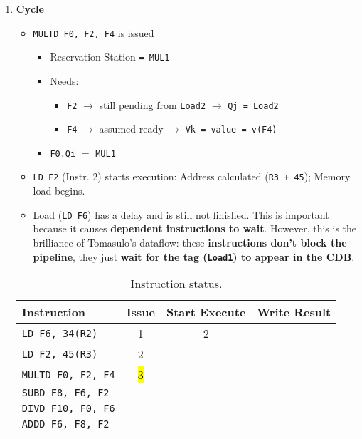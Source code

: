 \begin{enumerate}
    \newpage


    \item \textbf{Cycle \theenumi}
    \begin{itemize}
        \item \texttt{MULTD F0, F2, F4} is issued
        \begin{itemize}
            \item Reservation Station \texttt{= MUL1}
            \item Needs:
            \begin{itemize}
                \item \texttt{F2} $\rightarrow$ still pending from \texttt{Load2} $\rightarrow$ \texttt{Qj = Load2}
                \item \texttt{F4} $\rightarrow$ assumed ready $\rightarrow$ \texttt{Vk = value = v(F4)}
            \end{itemize}
            \item \texttt{F0.Qi} $=$ \texttt{MUL1}
        \end{itemize}
        \item \texttt{LD F2} (Instr. 2) starts execution: Address calculated (\texttt{R3 + 45}); Memory load begins.
        \item Load (\texttt{LD F6}) has a delay and is still not finished. This is important because it causes \textbf{dependent instructions to wait}. However, this is the brilliance of Tomasulo's dataflow: these \textbf{instructions don't block the pipeline}, they just \textbf{wait for the tag (\texttt{Load1}) to appear in the CDB}.
    \end{itemize}

    \begin{table}[!htp]
        \centering
        \begin{tabular}{@{} l | c c c @{}}
            \toprule
            Instruction                 & Issue & Start Execute & Write Result  \\
            \midrule
            \texttt{LD    F6, 34(R2)}   & 1     & 2             &               \\ [.3em]
            \texttt{LD    F2, 45(R3)}   & 2     &               &               \\ [.3em]
            \texttt{MULTD F0, F2, F4}   & \hl{3}&               &               \\ [.3em]
            \texttt{SUBD  F8, F6, F2}   &       &               &               \\ [.3em]
            \texttt{DIVD  F10, F0, F6}  &       &               &               \\ [.3em]
            \texttt{ADDD  F6, F8, F2}   &       &               &               \\
            \bottomrule
        \end{tabular}
        \caption*{Instruction status.}
    \end{table}


\end{enumerate}
